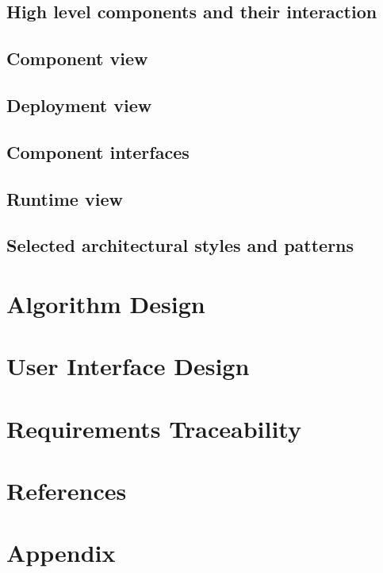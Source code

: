 \documentclass[12pt, a4paper]{article}
\begin{document}
    	\subsection{High level components and their interaction}
    	    
 
        \subsection{Component view}
            
    	
    	\subsection{Deployment view}
    	    
    	
    	\subsection{Component interfaces}
    	    
    	
    	\subsection{Runtime view}
    	
    	
    	
    	\subsection{Selected architectural styles and patterns}
    	
    	
    \newpage	    
    \section{Algorithm Design}
         
    
    \newpage
    \section{User Interface Design}
        
        
    \newpage
    \section{Requirements Traceability}
        
        
    \newpage
    \section{References}
        
        
    \newpage
    \section*{Appendix}
        
\end{document}
